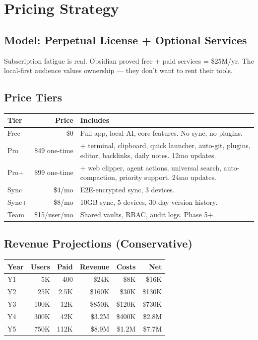 \documentclass[11pt,a4paper]{article}
\begin{document}
\section{Pricing Strategy}

\subsection{Model: Perpetual License + Optional Services}

Subscription fatigue is real. Obsidian proved free + paid services = \$25M/yr. The local-first audience values ownership --- they don't want to rent their tools.

\subsection{Price Tiers}

\begin{table}[h]\centering\small
\begin{tabularx}{\textwidth}{lrX}
\toprule
\textbf{Tier} & \textbf{Price} & \textbf{Includes} \\
\midrule
Free & \$0 & Full app, local AI, core features. No sync, no plugins. \\
Pro & \$49 one-time & + terminal, clipboard, quick launcher, auto-git, plugins, editor, backlinks, daily notes. 12mo updates. \\
Pro+ & \$99 one-time & + web clipper, agent actions, universal search, auto-compaction, priority support. 24mo updates. \\
Sync & \$4/mo & E2E-encrypted sync, 3 devices. \\
Sync+ & \$8/mo & 10GB sync, 5 devices, 30-day version history. \\
Team & \$15/user/mo & Shared vaults, RBAC, audit logs. Phase 5+. \\
\bottomrule
\end{tabularx}
\end{table}

\subsection{Revenue Projections (Conservative)}

\begin{table}[h]\centering\small
\begin{tabularx}{\textwidth}{Xrrrrr}
\toprule
\textbf{Year} & \textbf{Users} & \textbf{Paid} & \textbf{Revenue} & \textbf{Costs} & \textbf{Net} \\
\midrule
Y1 & 5K & 400 & \$24K & \$8K & \$16K \\
Y2 & 25K & 2.5K & \$160K & \$30K & \$130K \\
Y3 & 100K & 12K & \$850K & \$120K & \$730K \\
Y4 & 300K & 42K & \$3.2M & \$400K & \$2.8M \\
Y5 & 750K & 112K & \$8.9M & \$1.2M & \$7.7M \\
\bottomrule
\end{tabularx}
\end{table}
\end{document}
